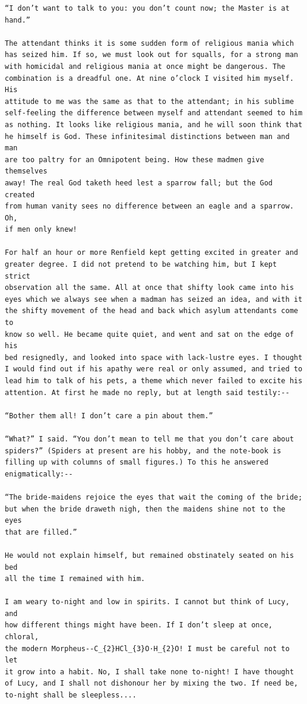 \documentclass{article}
\begin{document}
\begin{verbatim}
“I don’t want to talk to you: you don’t count now; the Master is at
hand.”

The attendant thinks it is some sudden form of religious mania which
has seized him. If so, we must look out for squalls, for a strong man
with homicidal and religious mania at once might be dangerous. The
combination is a dreadful one. At nine o’clock I visited him myself. His
attitude to me was the same as that to the attendant; in his sublime
self-feeling the difference between myself and attendant seemed to him
as nothing. It looks like religious mania, and he will soon think that
he himself is God. These infinitesimal distinctions between man and man
are too paltry for an Omnipotent being. How these madmen give themselves
away! The real God taketh heed lest a sparrow fall; but the God created
from human vanity sees no difference between an eagle and a sparrow. Oh,
if men only knew!

For half an hour or more Renfield kept getting excited in greater and
greater degree. I did not pretend to be watching him, but I kept strict
observation all the same. All at once that shifty look came into his
eyes which we always see when a madman has seized an idea, and with it
the shifty movement of the head and back which asylum attendants come to
know so well. He became quite quiet, and went and sat on the edge of his
bed resignedly, and looked into space with lack-lustre eyes. I thought
I would find out if his apathy were real or only assumed, and tried to
lead him to talk of his pets, a theme which never failed to excite his
attention. At first he made no reply, but at length said testily:--

“Bother them all! I don’t care a pin about them.”

“What?” I said. “You don’t mean to tell me that you don’t care about
spiders?” (Spiders at present are his hobby, and the note-book is
filling up with columns of small figures.) To this he answered
enigmatically:--

“The bride-maidens rejoice the eyes that wait the coming of the bride;
but when the bride draweth nigh, then the maidens shine not to the eyes
that are filled.”

He would not explain himself, but remained obstinately seated on his bed
all the time I remained with him.

I am weary to-night and low in spirits. I cannot but think of Lucy, and
how different things might have been. If I don’t sleep at once, chloral,
the modern Morpheus--C_{2}HCl_{3}O·H_{2}O! I must be careful not to let
it grow into a habit. No, I shall take none to-night! I have thought
of Lucy, and I shall not dishonour her by mixing the two. If need be,
to-night shall be sleepless....


\end{verbatim}
\end{document}
